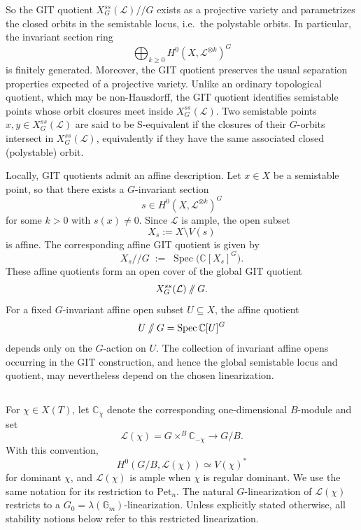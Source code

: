 \documentclass[12pt, reqno]{amsart}
\newcommand{\sslash}{\mathbin{/\mkern-6mu/}}
\theoremstyle{plain}
\numberwithin{equation}{section}
\theoremstyle{definition}
\begin{document}
So the GIT quotient $X_G^{ss}(\mathcal L)//G$ exists as a projective variety and
parametrizes the closed orbits in the semistable locus, i.e.\ the
polystable orbits. In particular, the invariant section ring
\[
\bigoplus_{k\ge 0} H^0\!\left(X, \mathcal L^{\otimes k}\right)^G
\]
is finitely generated. Moreover, the GIT quotient preserves the usual separation properties expected of a projective variety. Unlike an ordinary topological quotient, which may
be non-Hausdorff, the GIT quotient identifies semistable points whose
orbit closures meet inside $X_G^{ss}(\mathcal L)$. Two semistable points
$x,y \in X_G^{ss}(\mathcal L)$ are said to be S-equivalent if the closures of their
$G$-orbits intersect in $X_G^{ss}(\mathcal L)$, equivalently if they have the same
associated closed (polystable) orbit.

Locally, GIT quotients admit an affine description. Let $x \in X$ be a semistable point, so that there exists a $G$-invariant section 
\[
s \in H^0(X, \mathcal L^{\otimes k})^G
\]
for some $k > 0$ with $s(x) \neq 0$. Since $\mathcal L$ is ample, the open subset
\[
X_s := X \setminus V(s)
\]
is affine. The corresponding affine GIT quotient is given by
\[
X_s /\!/ G \;:=\; \operatorname{Spec}\big( \mathbb{C}[X_s]^G \big).
\]
These affine quotients form an open cover of the global GIT quotient \[ X_G^{ss}(\mathcal L)\sslash G. \] For a fixed \(G\)-invariant affine open subset \(U\subseteq X\), the affine quotient \[ U\sslash G=\operatorname{Spec}\mathbb C[U]^G \] depends only on the \(G\)-action on \(U\). The collection of invariant affine opens occurring in the GIT construction, and hence the global semistable locus and quotient, may nevertheless depend on the chosen linearization.

\subsection{} For \(\chi\in X(T)\), let \(\mathbb C_\chi\) denote the corresponding one-dimensional \(B\)-module and set \[ \mathcal L(\chi) = G\times^B\mathbb C_{-\chi}\longrightarrow G/B. \] With this convention, \[ H^0(G/B,\mathcal L(\chi))\simeq V(\chi)^* \] for dominant \(\chi\), and \(\mathcal L(\chi)\) is ample when \(\chi\) is regular dominant. We use the same notation for its restriction to \(\mathrm{Pet}_n\). The natural \(G\)-linearization of \(\mathcal L(\chi)\) restricts to a \(G_0=\lambda(\mathbb G_m)\)-linearization. Unless explicitly stated otherwise, all stability notions below refer to this restricted linearization.
\end{document}
